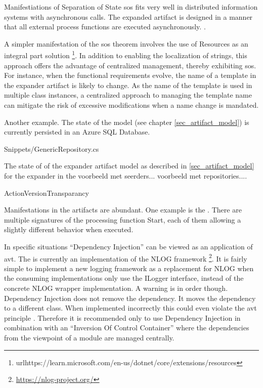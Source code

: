 Manifestiations of Separation of State
\gls{sos} fits very well in distributed information systems with asynchronous calls. The
expanded artifact is designed in a manner that all external process functions are executed
asynchronously. .

A simpler manifestation of the \gls{sos} theorem involves the use of Resources as an
integral part solution
\footnote{url{https://learn.microsoft.com/en-us/dotnet/core/extensions/resources}}. In
addition to enabling the localization of strings, this approach offers the advantage of
centralized management, thereby exhibiting \gls{sos}. For instance, when the functional
requirements evolve, the name of a template in the expander artifact is likely to change.
As the name of the template is used in multiple class instances, a centralized approach to
managing the template name can mitigate the risk of excessive modifications when a name
change is mandated.

Another example. The state of the model (see chapter \ref{sec_artifact_model}) is
currently persisted in an Azure SQL Database.


    {Snippets/GenericRepository.cs}

The state of of the expander artifact model as described in \ref{sec_artifact_model} for the expander in the 
voorbeeld met seerders...
voorbeeld met repositories....



ActionVersionTransparancy

Manifestations in the artifacts are abundant. One example is the
. There are multiple signatures of the
processing function Start, each of them allowing a slightly different behavior when
executed.

In specific situations \enquote{Dependency Injection} can be viewed as an application of
\gls{avt}. The  is currently an implementation of the NLOG
framework \footnote{\url{https://nlog-project.org/}}. It is fairly simple to implement a
new logging framework as a replacement for NLOG when the consuming implementations only
use the ILogger interface, instead of the concrete NLOG wrapper implementation. A warning
is in order though. Dependency Injection does not remove the dependency. It moves the
dependency to a different class. When implemented incorrectly this could even violate the
\gls{avt} principle \parencite[213]{mannaert_normalized_2016}. Therefore it is recommended
only to use Dependency Injection in combination with an \enquote{Inversion Of Control
Container} where the dependencies from the viewpoint of a module are managed centrally.

